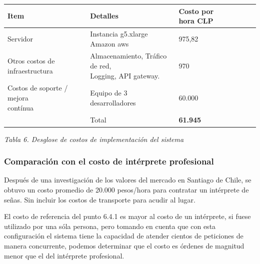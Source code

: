 \documentclass[10pt]{article}
\begin{document}
\begin{table}[H]
\begin{adjustbox}{max width=\textwidth}
\begin{tabular}{p{4.21cm}p{6.8cm}p{5.5cm}p{4.21cm}p{6.8cm}p{5.5cm}}
\hline
\multicolumn{1}{|p{4.21cm}}{Item} & 
\multicolumn{1}{|p{6.8cm}}{Detalles} & 
\multicolumn{1}{|p{5.5cm}|}{Costo por hora CLP} \\ 
\hline
\multicolumn{1}{|p{4.21cm}}{Servidor} & 
\multicolumn{1}{|p{6.8cm}}{Instancia g5.xlarge Amazon aws} & 
\multicolumn{1}{|p{5.5cm}|}{975,82} \\ 
\hline
\multicolumn{1}{|p{4.21cm}}{Otros costos de infraestructura} & 
\multicolumn{1}{|p{6.8cm}}{Almacenamiento, Tráfico de red, \newline
Logging, API gateway.} & 
\multicolumn{1}{|p{5.5cm}|}{970} \\ 
\hline
\multicolumn{1}{|p{4.21cm}}{Costos de soporte / mejora \newline
contínua \newline
} & 
\multicolumn{1}{|p{6.8cm}}{Equipo de 3 desarrolladores } & 
\multicolumn{1}{|p{5.5cm}|}{60.000} \\ 
\hline
\multicolumn{1}{|p{4.21cm}}{} & 
\multicolumn{1}{|p{6.8cm}}{Total} & 
\multicolumn{1}{|p{5.5cm}|}{\textbf{61.945}} \\ 
\hline
\end{tabular}
\end{adjustbox}
\end{table}
\vspace{6\baselineskip}
\begin{center}
\textit{Tabla 6. Desglose de costos de implementación del sistema}
\end{center}


\vspace{2\baselineskip}
\subsubsection{Comparación con el costo de intérprete profesional}

\vspace{1\baselineskip}
Después de una investigación de los valores del mercado en Santiago de Chile, se obtuvo un costo promedio de 20.000 pesos/hora para contratar un intérprete de señas. Sin incluir los costos de transporte para acudir al lugar.

\vspace{1\baselineskip}
El costo de referencia del punto 6.4.1 es mayor al costo de un intérprete, si fuese utilizado por una sóla persona, pero tomando en cuenta que con esta configuración el sistema tiene la capacidad de atender cientos de peticiones de manera concurrente, podemos determinar que el costo es órdenes de magnitud menor que el del intérprete profesional.
\end{document}
